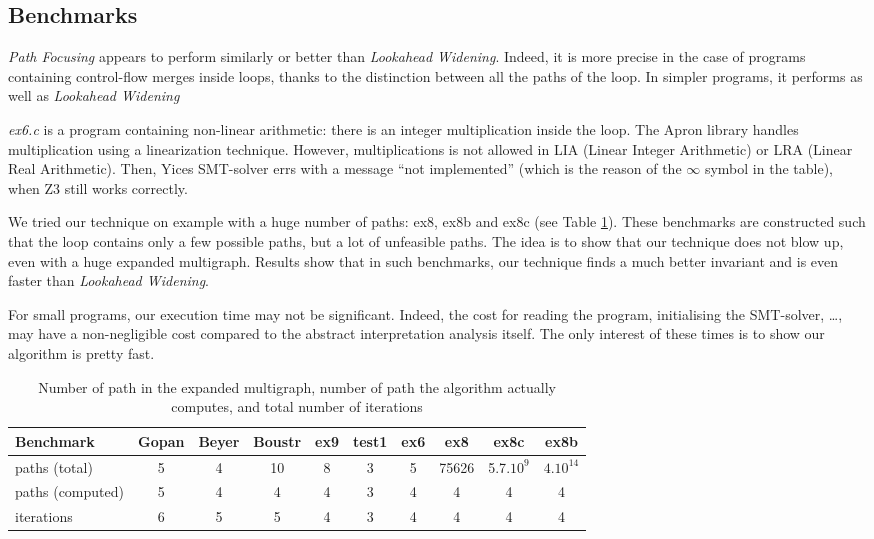 \documentclass[a4paper,english,titlepage,11pt]{report}
\begin{document}
	\subsection{Benchmarks}

\emph{Path Focusing} appears to perform similarly or better than 
\emph{Lookahead Widening}. Indeed, it is more precise in the case of programs
containing control-flow merges inside  loops, thanks to the distinction
between all the paths of the loop. In simpler programs, it performs as well as
\emph{Lookahead Widening}

\emph{ex6.c} is a program containing non-linear arithmetic: there is an integer
multiplication inside the loop. The Apron library handles multiplication using
a linearization technique. However, multiplications is not allowed in LIA
(Linear Integer Arithmetic) or LRA (Linear Real Arithmetic). Then, Yices
SMT-solver errs with a message ``not implemented'' (which is the reason of the
$\infty$ symbol in the table), when Z3 still works correctly.

We tried our technique on example with a huge number of paths: ex8, ex8b and
ex8c (see Table \ref{npaths}). These benchmarks are constructed such that the
loop contains only a few
possible paths, but a lot of unfeasible paths. The idea is to show that our
technique does not blow up, even with a huge expanded multigraph. Results show
that in such benchmarks, our technique finds a much better invariant and is even
faster than \emph{Lookahead Widening}.

For small programs, our execution time may not be significant. Indeed, the cost
for reading the program, initialising the SMT-solver, \dots, may have a
	non-negligible cost compared to the abstract interpretation analysis itself.
	The only interest of these times is to show our algorithm is pretty fast.

\begin{table}[!h]
\begin{tabular}{|l||c|c|c|c|c|c|c|c|c|} \hline
Benchmark  & Gopan & Beyer & Boustr & ex9 & test1 & ex6 & ex8 &
ex8c & ex8b\\ \hline \hline
paths (total) & 5 & 4 & 10 & 8 & 3 & 5 & 75626 & 5.7$.10^9$ & $4.10^{14}$\\
\hline
paths (computed) & 5 & 4 & 4 & 4 & 3 & 4 & 4 & 4 & 4\\ \hline
iterations  & 6 & 5 & 5 & 4 & 3 & 4 & 4 & 4 & 4\\ \hline
\end{tabular}
\caption{Number of path in the expanded multigraph, number of path the
algorithm actually computes, and total number of iterations}
\label{npaths}
\end{table}
\end{document}
